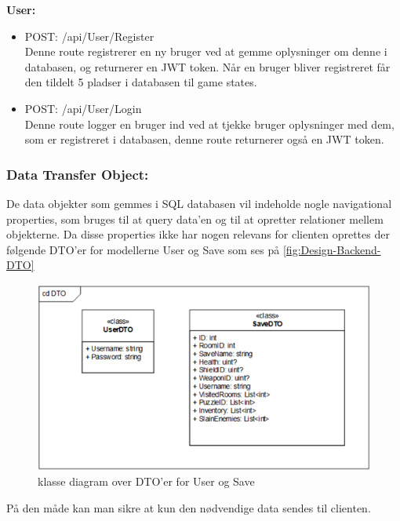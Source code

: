 \textbf{User:}\\
\begin{itemize}
\item POST: /api/User/Register\\
Denne route registrerer en ny bruger ved at gemme oplysninger om denne i databasen, og returnerer en JWT token. Når en bruger bliver registreret får den tildelt 5 pladser i databasen til game states.
\item POST: /api/User/Login\\
Denne route logger en bruger ind ved at tjekke bruger oplysninger med dem, som er registreret i databasen, denne route returnerer også en JWT token.
\end{itemize}

\subsubsection{Data Transfer Object:}

De data objekter som gemmes i SQL databasen vil indeholde nogle navigational properties, som bruges til at query data’en og til at opretter relationer mellem objekterne. Da disse properties ikke har nogen relevans for clienten oprettes der følgende DTO’er for modellerne User og Save som ses på \autoref{fig:Design-Backend-DTO}\\

\begin{figure}[H]
\centering
\includegraphics[width = \textwidth]{02-Body/Images/Backend_DTO.PNG}
\caption{klasse diagram over DTO'er for User og Save}
\label{fig:Design-Backend-DTO}
\end{figure}

På den måde kan man sikre at kun den nødvendige data sendes til clienten.\\

